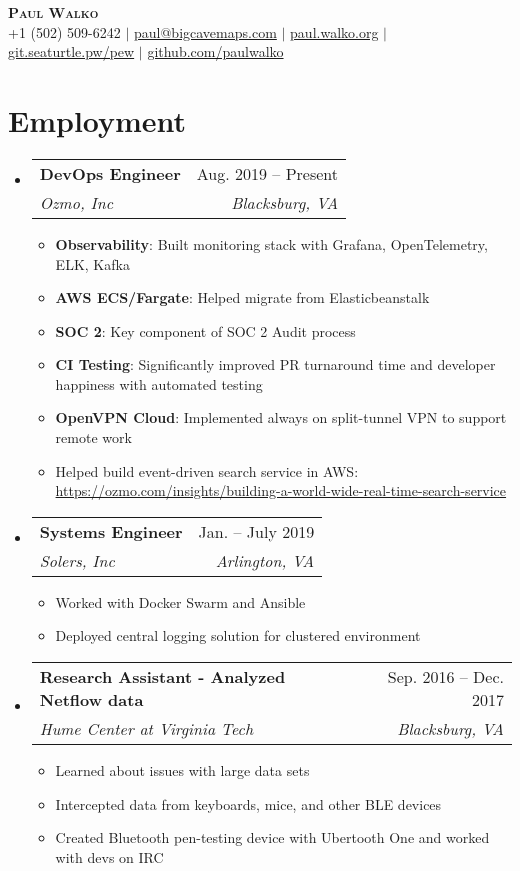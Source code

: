\documentclass[letterpaper,12pt]{article}
\makeatletter
\newcommand{\resumeItem}[1]{
  \item\small{
    {#1 \vspace{-2pt}}
  }
}
\newcommand{\resumeSubheading}[4]{
  \vspace{-2pt}\item
    \begin{tabular*}{0.97\textwidth}[t]{l@{\extracolsep{\fill}}r}
      \textbf{#1} & #2 \\
      \textit{\small#3} & \textit{\small #4} \\
    \end{tabular*}\vspace{-7pt}
}
\newcommand{\resumeSubHeadingListStart}{\begin{itemize}[leftmargin=0.15in, label={}]}
\newcommand{\resumeSubHeadingListEnd}{\end{itemize}}
\newcommand{\resumeItemListStart}{\begin{itemize}}
\newcommand{\resumeItemListEnd}{\end{itemize}\vspace{-5pt}}
\makeatother
\begin{document}
\begin{center}
    \textbf{\Huge \scshape Paul Walko} \\ \vspace{1pt}
    \small +1 (502) 509-6242 $|$ \href{mailto:paul@bigcavemaps.com}{paul@bigcavemaps.com} $|$ 
    \href{https://paul.walko.org}{paul.walko.org} $|$
    \href{https://git.seaturtle.pw/pew}{git.seaturtle.pw/pew} $|$ \href{https://github.com/paulwalko}{github.com/paulwalko}
\end{center}





\section{Employment}
  \resumeSubHeadingListStart
    \resumeSubheading
      {DevOps Engineer} {Aug. 2019 -- Present}
      {Ozmo, Inc}{Blacksburg, VA}
      \resumeItemListStart
	    \resumeItem{\textbf{Observability}: Built monitoring stack with Grafana, OpenTelemetry, ELK, Kafka}
      	\resumeItem{\textbf{AWS ECS/Fargate}: Helped migrate from Elasticbeanstalk}
      	\resumeItem{\textbf{SOC 2}: Key component of SOC 2 Audit process}
        \resumeItem{\textbf{CI Testing}: Significantly improved PR turnaround time and developer happiness with automated testing}
        \resumeItem{\textbf{OpenVPN Cloud}: Implemented always on split-tunnel VPN to support remote work}
        \resumeItem{Helped build event-driven search service in AWS: \\ \href{https://ozmo.com/insights/building-a-world-wide-real-time-search-service/}{https://ozmo.com/insights/building-a-world-wide-real-time-search-service}}
      \resumeItemListEnd

    \resumeSubheading
      {Systems Engineer }{Jan. -- July 2019}
      {Solers, Inc}{Arlington, VA}
      \resumeItemListStart
        \resumeItem{Worked with Docker Swarm and Ansible}
        \resumeItem{Deployed central logging solution for clustered environment}
      \resumeItemListEnd

    \resumeSubheading
      {Research Assistant - Analyzed Netflow data} {Sep. 2016 -- Dec. 2017}
      {Hume Center at Virginia Tech}{Blacksburg, VA}
      \resumeItemListStart
        \resumeItem{Learned about issues with large data sets}
        \resumeItem{Intercepted data from keyboards, mice, and other BLE devices}
        \resumeItem{Created Bluetooth pen-testing device with Ubertooth One and worked with devs on IRC}
      \resumeItemListEnd
  \resumeSubHeadingListEnd
\end{document}
